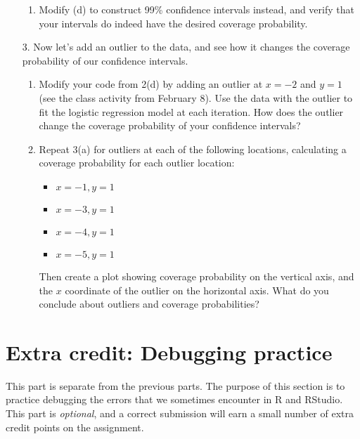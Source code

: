 \documentclass[11pt]{article}
\begin{document}
\begin{enumerate}
\begin{enumerate}
\item Modify (d) to construct 99\% confidence intervals instead, and verify that your intervals do indeed have the desired coverage probability.
\end{enumerate}

\item[3.] Now let's add an outlier to the data, and see how it changes the coverage probability of our confidence intervals.

\begin{enumerate}
\item Modify your code from 2(d) by adding an outlier at $x = -2$ and $y = 1$ (see the class activity from February 8). Use the data with the outlier to fit the logistic regression model at each iteration. How does the outlier change the coverage probability of your confidence intervals?

\item Repeat 3(a) for outliers at each of the following locations, calculating a coverage probability for each outlier location:
\begin{itemize}
\item $x = -1, y = 1$
\item $x = -3, y = 1$
\item $x = -4, y = 1$
\item $x = -5, y = 1$
\end{itemize}
Then create a plot showing coverage probability on the vertical axis, and the $x$ coordinate of the outlier on the horizontal axis. What do you conclude about outliers and coverage probabilities?
\end{enumerate}
\end{enumerate}

\vspace{1cm}

\section{Extra credit: Debugging practice}

This part is separate from the previous parts. The purpose of this section is to practice debugging the errors that we sometimes encounter in R and RStudio. This part is \textit{optional}, and a correct submission will earn a small number of extra credit points on the assignment.
\end{document}
